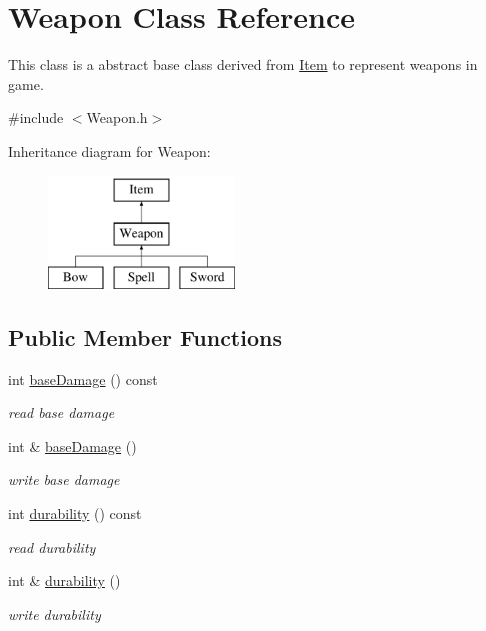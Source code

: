 \hypertarget{classWeapon}{\section{Weapon Class Reference}
\label{classWeapon}
}


This class is a abstract base class derived from \hyperlink{classItem}{Item} to represent weapons in game.  




{\ttfamily \#include $<$Weapon.\-h$>$}

Inheritance diagram for Weapon\-:\begin{figure}[H]
\begin{center}
\leavevmode
\includegraphics[height=3.000000cm]{classWeapon}
\end{center}
\end{figure}
\subsection*{Public Member Functions}
\begin{DoxyCompactItemize}
\item 
int \hyperlink{classWeapon_a1a74dac4314abc954c2f60d9ac204ae2}{base\-Damage} () const 
\begin{DoxyCompactList}\small\item\em read base damage \end{DoxyCompactList}\item 
int \& \hyperlink{classWeapon_afbc352ff3215793c073501859aa9c10d}{base\-Damage} ()
\begin{DoxyCompactList}\small\item\em write base damage \end{DoxyCompactList}\item 
int \hyperlink{classWeapon_a8f016a5f36802b05e92969f4a0d87649}{durability} () const 
\begin{DoxyCompactList}\small\item\em read durability \end{DoxyCompactList}\item 
int \& \hyperlink{classWeapon_a3557c5fa326d73478b97787ceaef532b}{durability} ()
\begin{DoxyCompactList}\small\item\em write durability \end{DoxyCompactList}\end{DoxyCompactItemize}
